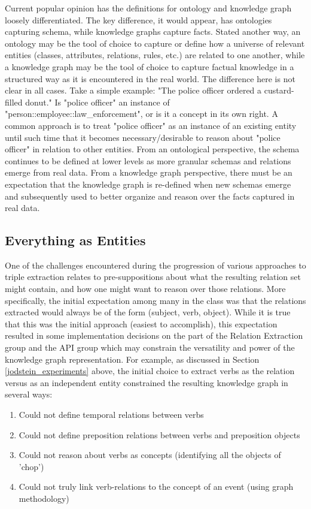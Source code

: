 \documentclass[11pt,letterpaper]{article}
\begin{document}
Current popular opinion \cite{science_where_2018, schrader_whats_2020} has the definitions for ontology and knowledge graph loosely differentiated.  The key difference, it would appear, has ontologies capturing schema, while knowledge graphs capture facts.  Stated another way, an ontology may be the tool of choice to capture or define how a universe of relevant entities (classes, attributes, relations, rules, etc.) are related to one another, while a knowledge graph may be the tool of choice to capture factual knowledge in a structured way as it is encountered in the real world.  The difference here is not clear in all cases.  Take a simple example: "The police officer ordered a custard-filled donut."  Is "police officer" an instance of "person::employee::law\_enforcement", or is it a concept in its own right.  A common approach is to treat "police officer" as an instance of an existing entity until such time that it becomes necessary/desirable to reason about "police officer" in relation to other entities.  From an ontological perspective, the schema continues to be defined at lower levels as more granular schemas and relations emerge from real data.  From a knowledge graph perspective, there must be an expectation that the knowledge graph is re-defined when new schemas emerge and subsequently used to better organize and reason over the facts captured in real data.


\subsection{Everything as Entities}

One of the challenges encountered during the progression of various approaches to triple extraction relates to pre-suppositions about what the resulting relation set might contain, and how one might want to reason over those relations.  More specifically, the initial expectation among many in the class was that the relations extracted would always be of the form (subject, verb, object).  While it is true that this was the initial approach (easiest to accomplish), this expectation resulted in some implementation decisions on the part of the Relation Extraction group and the API group which may constrain the versatility and power of the knowledge graph representation.  For example, as discussed in Section \ref{jodstein_experiments} above, the initial choice to extract verbs as the relation versus as an independent entity constrained the resulting knowledge graph in several ways:

\begin{enumerate}
    \item Could not define temporal relations between verbs
    \item Could not define preposition relations between verbs and preposition objects
    \item Could not reason about verbs as concepts (identifying all the objects of 'chop')
    \item Could not truly link verb-relations to the concept of an event (using graph methodology)
\end{enumerate}
\end{document}
